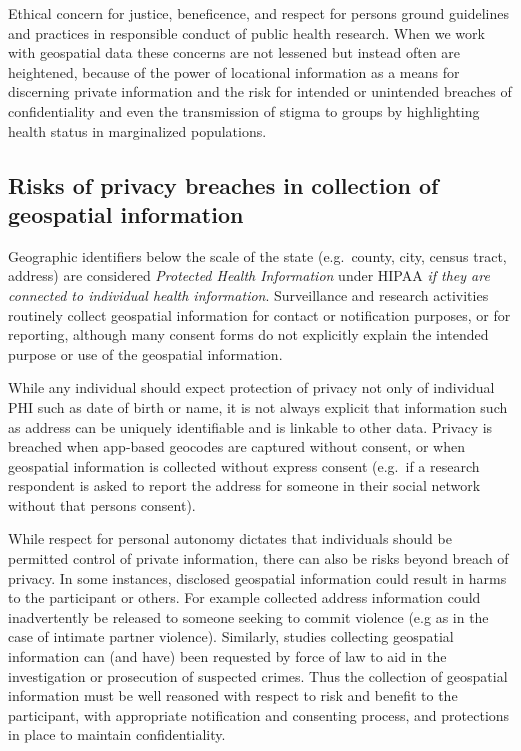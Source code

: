 \documentclass[
]{book}
\begin{document}
Ethical concern for justice, beneficence, and respect for persons ground guidelines and practices in responsible conduct of public health research. When we work with geospatial data these concerns are not lessened but instead often are heightened, because of the power of locational information as a means for discerning private information and the risk for intended or unintended breaches of confidentiality and even the transmission of stigma to groups by highlighting health status in marginalized populations.

\hypertarget{risks-of-privacy-breaches-in-collection-of-geospatial-information}{%
\subsection{Risks of privacy breaches in collection of geospatial information}\label{risks-of-privacy-breaches-in-collection-of-geospatial-information}}

Geographic identifiers below the scale of the state (e.g.~county, city, census tract, address) are considered \emph{Protected Health Information } under HIPAA \emph{if they are connected to individual health information}. Surveillance and research activities routinely collect geospatial information for contact or notification purposes, or for reporting, although many consent forms do not explicitly explain the intended purpose or use of the geospatial information.

While any individual should expect protection of privacy not only of individual PHI such as date of birth or name, it is not always explicit that information such as address can be uniquely identifiable and is linkable to other data. Privacy is breached when app-based geocodes are captured without consent, or when geospatial information is collected without express consent (e.g.~if a research respondent is asked to report the address for someone in their social network without that persons consent).

While respect for personal autonomy dictates that individuals should be permitted control of private information, there can also be risks beyond breach of privacy. In some instances, disclosed geospatial information could result in harms to the participant or others. For example collected address information could inadvertently be released to someone seeking to commit violence (e.g as in the case of intimate partner violence). Similarly, studies collecting geospatial information can (and have) been requested by force of law to aid in the investigation or prosecution of suspected crimes. Thus the collection of geospatial information must be well reasoned with respect to risk and benefit to the participant, with appropriate notification and consenting process, and protections in place to maintain confidentiality.
\end{document}
